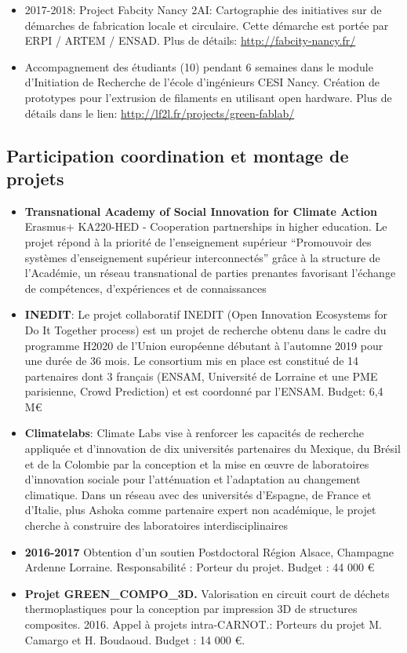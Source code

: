\documentclass[
  11pt,
]{article}
\begin{document}
\begin{itemize}
\item
  2017-2018: Project Fabcity Nancy 2AI: Cartographie des initiatives sur
  de démarches de fabrication locale et circulaire. Cette démarche est
  portée par ERPI / ARTEM / ENSAD. Plus de détails:
  \url{http://fabcity-nancy.fr/}
\item
  Accompagnement des étudiants (10) pendant 6 semaines dans le module
  d'Initiation de Recherche de l'école d'ingénieurs CESI Nancy. Création
  de prototypes pour l'extrusion de filaments en utilisant open
  hardware. Plus de détails dans le lien:
  \url{http://lf2l.fr/projects/green-fablab/}
\end{itemize}

\hypertarget{participation-coordination-et-montage-de-projets}{%
\subsection{Participation coordination et montage de
projets}\label{participation-coordination-et-montage-de-projets}}

\begin{itemize}
\item
  \textbf{Transnational Academy of Social Innovation for Climate Action}
  Erasmus+ KA220-HED - Cooperation partnerships in higher education. Le
  projet répond à la priorité de l'enseignement supérieur ``Promouvoir
  des systèmes d'enseignement supérieur interconnectés'' grâce à la
  structure de l'Académie, un réseau transnational de parties prenantes
  favorisant l'échange de compétences, d'expériences et de connaissances
\item
  \textbf{INEDIT}: Le projet collaboratif INEDIT (Open Innovation
  Ecosystems for Do It Together process) est un projet de recherche
  obtenu dans le cadre du programme H2020 de l'Union européenne débutant
  à l'automne 2019 pour une durée de 36 mois. Le consortium mis en place
  est constitué de 14 partenaires dont 3 français (ENSAM, Université de
  Lorraine et une PME parisienne, Crowd Prediction) et est coordonné par
  l'ENSAM. Budget: 6,4 M€
\item
  \textbf{Climatelabs}: Climate Labs vise à renforcer les capacités de
  recherche appliquée et d'innovation de dix universités partenaires du
  Mexique, du Brésil et de la Colombie par la conception et la mise en
  œuvre de laboratoires d'innovation sociale pour l'atténuation et
  l'adaptation au changement climatique. Dans un réseau avec des
  universités d'Espagne, de France et d'Italie, plus Ashoka comme
  partenaire expert non académique, le projet cherche à construire des
  laboratoires interdisciplinaires
\item
  \textbf{2016-2017} Obtention d'un soutien Postdoctoral Région Alsace,
  Champagne Ardenne Lorraine. Responsabilité : Porteur du projet. Budget
  : 44 000 €
\item
  \textbf{Projet GREEN\_COMPO\_3D.} Valorisation en circuit court de
  déchets thermoplastiques pour la conception par impression 3D de
  structures composites. 2016. Appel à projets intra-CARNOT.: Porteurs
  du projet M. Camargo et H. Boudaoud. Budget : 14 000 €.
\end{itemize}
\end{document}
